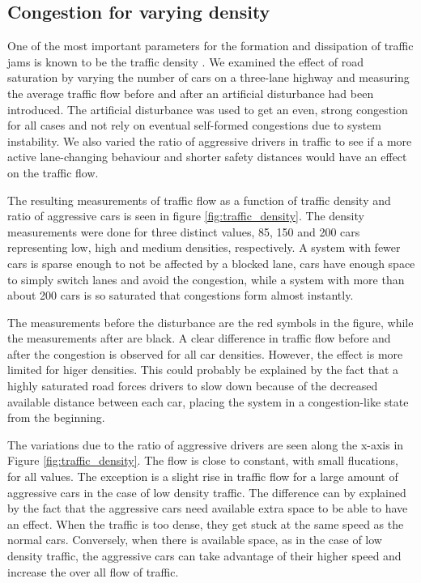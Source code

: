 \documentclass[11pt,a4paper,twocolumn]{article}
\begin{document}
 \subsection{Congestion for varying density}
 One of the most important parameters for the formation and dissipation of traffic jams is known to be the traffic density \cite{kerner96trafficjam, kerner97flow}. We examined the effect of road saturation by varying the number of cars on a three-lane highway and measuring the average traffic flow  before and after an artificial disturbance had been introduced. The artificial disturbance was used to get an even, strong congestion for all cases and not rely on eventual self-formed congestions due to system instability.  We also varied the ratio of aggressive drivers in traffic to see if a more active lane-changing behaviour and shorter safety distances would have an effect on the traffic flow.
 
 The resulting measurements of traffic flow as a function of traffic density and ratio of aggressive cars is seen in figure \ref{fig:traffic_density}. The density measurements were done for three distinct values, 85, 150 and 200 cars representing low, high and medium densities, respectively. A system with fewer cars is sparse enough to not be affected by a blocked lane, cars have enough space to simply switch lanes and avoid the congestion, while a system with more than about 200 cars is so saturated that congestions form almost instantly.
 
 The measurements before the disturbance are the red symbols in the figure, while the measurements after are black. A clear difference in traffic flow before and after the congestion is observed for all car densities. However, the effect is more limited for higer densities. This could probably be explained by the fact that a highly saturated road forces drivers to slow down because of the decreased available distance between each car, placing the system in a congestion-like state from the beginning.

 The variations due to the ratio of aggressive drivers are seen along the x-axis in Figure \ref{fig:traffic_density}. The flow is close to constant, with small flucations, for all values. The exception is a slight rise in traffic flow for a large amount of aggressive cars in the case of low density traffic. The difference can by explained by the fact that the aggressive cars need available extra space to be able to have an effect. When the traffic is too dense, they get stuck at the same speed as the normal cars. Conversely, when there is available space, as in the case of low density traffic, the aggressive cars can take advantage of their higher speed and increase the over all flow of traffic.  
\end{document}

